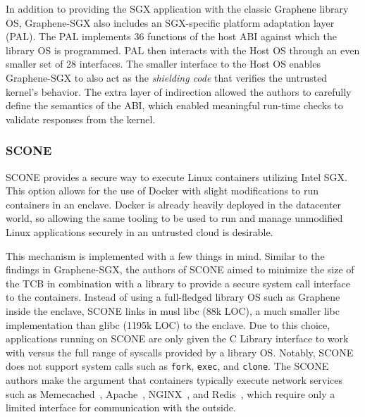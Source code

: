 \documentclass[letterpaper,twocolumn,10pt]{article}
\providecommand{\todo}[1]{{\protect\color{red}\noindent {\bf [TODO]} \emph{#1} {\bf [/TODO]}}}
\begin{document}
In addition to providing the SGX application with the classic Graphene library
OS, Graphene-SGX also includes an SGX-specific platform adaptation layer (PAL).
The PAL implements 36 functions of the host ABI against which the library OS is
programmed. PAL then interacts with the Host OS through an even smaller set of
28 interfaces. The smaller interface to the Host OS enables Graphene-SGX to
also act as the \emph{shielding code} that verifies the untrusted kernel's
behavior. The extra layer of indirection allowed the authors to carefully
define the semantics of the ABI, which enabled meaningful run-time checks to
validate responses from the kernel.


\subsubsection{SCONE}
SCONE provides a secure way to execute Linux containers utilizing Intel SGX.
This option allows for the use of Docker with slight modifications to run
containers in an enclave. Docker is already heavily deployed in the datacenter
world, so allowing the same tooling to be used to run and manage unmodified
Linux applications securely in an untrusted cloud is desirable.

This mechanism is implemented with a few things in mind. Similar to the
findings in Graphene-SGX, the authors of SCONE aimed to minimize the size of
the TCB in combination with a library to provide a secure system call interface
to the containers. Instead of using a full-fledged library OS such as Graphene
inside the enclave, SCONE links in musl libc (88k LOC), a much smaller libc
implementation than glibc (1195k LOC) to the enclave. Due to this choice,
applications running on SCONE are only given the C Library interface to work
with versus the full range of syscalls provided by a library OS. Notably, SCONE
does not support system calls such as \verb|fork|, \verb|exec|, and
\verb|clone|. The SCONE authors make the argument that containers typically
execute network services such as
Memecached~\cite{fitzpatrick_distributed_2004},
Apache~\cite{noauthor_welcome!_nodate}, NGINX~\cite{reese_nginx:_2008}, and
Redis~\cite{noauthor_redis_nodate}, which require only a limited interface for
communication with the outside. 




\end{document}
